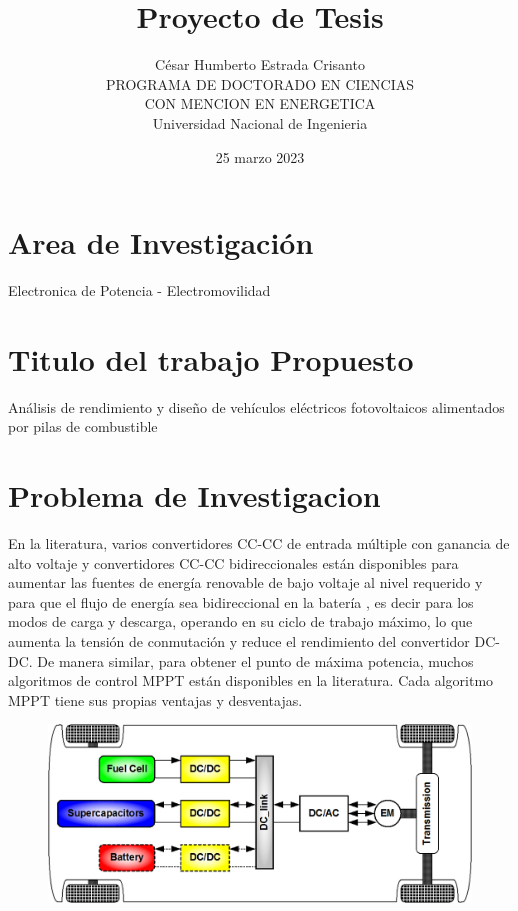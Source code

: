 \documentclass[12pt]{article}
\title{Proyecto de Tesis}
\author{César Humberto Estrada Crisanto \\
PROGRAMA DE DOCTORADO EN CIENCIAS \\ CON MENCION EN ENERGETICA \\
Universidad Nacional de Ingenieria}
\date{25 marzo 2023}
\begin{document}
	\maketitle
	
\begin{abstract}
	
	

\end{abstract}

\tableofcontents

\newpage
	
\section{Area de Investigación}
Electronica de Potencia - Electromovilidad	


\section{Titulo del trabajo Propuesto}
Análisis de rendimiento y diseño de vehículos eléctricos fotovoltaicos alimentados por pilas de combustible

\section{Problema de Investigacion}
En la literatura, varios convertidores CC-CC de entrada múltiple con ganancia de alto voltaje y convertidores CC-CC bidireccionales están disponibles para aumentar las fuentes de energía renovable de bajo voltaje al nivel requerido y para que el flujo de energía sea bidireccional en la batería , es decir para los modos de carga y descarga, operando en su ciclo de trabajo máximo, lo que aumenta la tensión de conmutación y reduce el rendimiento del convertidor DC-DC. De manera similar, para obtener el punto de máxima potencia, muchos algoritmos de control MPPT están disponibles en la literatura. Cada algoritmo MPPT tiene sus propias ventajas y desventajas.
\begin{figure}[h]
	\centering
	\includegraphics{image2.png}
	
	
\end{figure}
\end{document}

